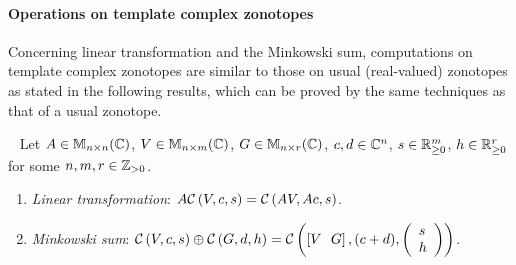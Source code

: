 \paragraph*{\bf Operations on template complex zonotopes}
Concerning linear transformation and the Minkowski sum, computations
on template complex zonotopes are similar to those on usual (real-valued) zonotopes
as stated in the following results, which can be proved by the same
techniques as that of a usual zonotope. %
%
\begin{lem}~\label{lem:lt}
  Let $A\in\mathbb{M}_{n\times n}(\mathbb{C})$, $V\in\mathbb{M}_{n\times m}(\mathbb{C})$, $G\in\mathbb{M}_{n\times r}(\mathbb{C})$, $c,d\in\mathbb{C}^n$, $s\in{{\mathbb{R}}}^m_{\geq 0}$,
  $h\in\mathbb{R}^r_{\geq 0}$ for some $n,m,r\in\mathbb{Z}_{> 0}$.
  
\begin{enumerate}%
\item \emph{Linear transformation}: $A\mathcal{C}\left(V,c,s\right)=\mathcal{C}\left(AV,Ac,s\right)$.
\item \emph{Minkowski sum}: $\mathcal{C}\left(V,c,s\right)\oplus\mathcal{C}\left(G,d,h\right)=\mathcal{C}\left(\left[V~~G\right],(c+d),\left(\begin{array}{l}s\\h\end{array}\right)\right)$.
\end{enumerate}
\end{lem}
%


